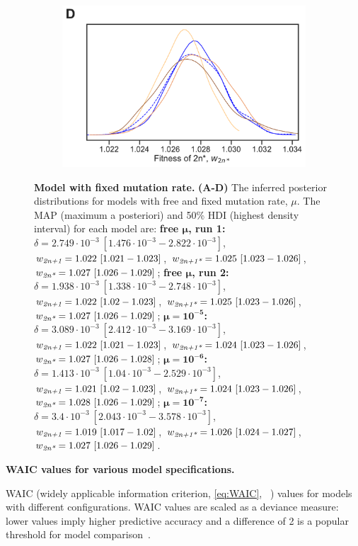 \documentclass[12pt]{extarticle}
\newcommand{\anwt}{\emph{2n+1}}
\newcommand{\eumt}{\emph{2n*}}
\newcommand{\anmt}{\emph{2n+1*}}
\begin{document}
\begin{figure}[h!]
\begin{subfigure}{0.45\textwidth}
  \end{subfigure}
    \begin{subfigure}{0.45\textwidth}
      \includegraphics[width=\textwidth]{../figures/mu-D.pdf}      
    \end{subfigure}
  \caption{
    \textbf{Model with fixed mutation rate.}  \textbf{(A-D)} The inferred posterior distributions for models with free and fixed mutation rate, $\mu$. The MAP (maximum a posteriori) and 50\% HDI (highest density interval) for each model are: 
\textbf{free $\boldsymbol{\mu}$, run 1:}
$\delta=2.749\cdot10^{-3}\ [1.476\cdot10^{-3}-2.822\cdot10^{-3}]$,
$w_{\anwt}=1.022\ [1.021-1.023]$,
$w_{\anmt}=1.025\ [1.023-1.026]$,
$w_{\eumt}=1.027\ [1.026-1.029]$;
\textbf{free $\boldsymbol{\mu}$, run 2:}
$\delta=1.938\cdot10^{-3}\ [1.338\cdot10^{-3}-2.748\cdot10^{-3}]$,
$w_{\anwt}=1.022\ [1.02-1.023]$,
$w_{\anmt}=1.025\ [1.023-1.026]$,
$w_{\eumt}=1.027\ [1.026-1.029]$;
\textbf{$\boldsymbol{\mu=10^{-5}}$:}
$\delta=3.089\cdot10^{-3}\ [2.412\cdot10^{-3}-3.169\cdot10^{-3}]$,
$w_{\anwt}=1.022\ [1.021-1.023]$,
$w_{\anmt}=1.024\ [1.023-1.026]$,
$w_{\eumt}=1.027\ [1.026-1.028]$;
\textbf{$\boldsymbol{\mu=10^{-6}}$:}
$\delta=1.413\cdot10^{-3}\ [1.04\cdot10^{-3}-2.529\cdot10^{-3}]$,
$w_{\anwt}=1.021\ [1.02-1.023]$,
$w_{\anmt}=1.024\ [1.023-1.026]$,
$w_{\eumt}=1.028\ [1.026-1.029]$;
\textbf{$\boldsymbol{\mu=10^{-7}}$:}
$\delta=3.4\cdot10^{-3}\ [2.043\cdot10^{-3}-3.578\cdot10^{-3}]$,
$w_{\anwt}=1.019\ [1.017-1.02]$,
$w_{\anmt}=1.026\ [1.024-1.027]$,
$w_{\eumt}=1.027\ [1.026-1.029]$.
\label{fig:mu}
  }
  \end{figure}

 
\begin{table}[h]
\centering
\caption{
\textbf{WAIC values for various model specifications.}}
\caption*{
	WAIC (widely applicable information criterion, \cref{eq:WAIC}, ~\citep{gelman2013bayesian}) values for models with different configurations. WAIC values are scaled as a deviance measure: lower values imply higher predictive accuracy and a difference of 2 is a popular threshold for model comparison~\citep{Kass1995}.
} 
\label{table:WAIC}
\end{table}
\end{document}
